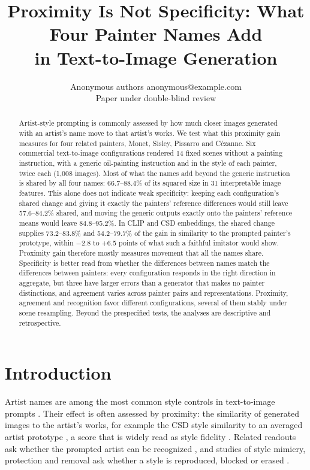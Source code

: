 \documentclass[10pt]{article}
\title{Proximity Is Not Specificity: What Four Painter Names Add\\in Text-to-Image Generation}
\author{\name Anonymous authors \email anonymous@example.com \\
      \addr Paper under double-blind review}
\begin{document}
\maketitle

\begin{abstract}
Artist-style prompting is commonly assessed by how much closer images generated with an
artist's name move to that artist's works. We test what this proximity gain measures for four
related painters, Monet, Sisley, Pissarro and C\'ezanne. Six commercial text-to-image
configurations rendered 14 fixed scenes without a painting instruction, with a generic
oil-painting instruction and in the style of each painter, twice each (1,008 images). Most of
what the names add beyond the generic instruction is shared by all four names: 66.7--88.4\% of
its squared size in 31 interpretable image features. This alone does not indicate weak
specificity: keeping each configuration's shared change and giving it exactly the painters'
reference differences would still leave 57.6--84.2\% shared, and moving the generic outputs
exactly onto the painters' reference means would leave 84.8--95.2\%. In CLIP and CSD
embeddings, the shared change supplies 73.2--83.8\% and 54.2--79.7\% of the gain in similarity
to the prompted painter's prototype, within $-$2.8 to +6.5 points of what such a faithful
imitator would show. Proximity gain therefore mostly measures movement that all the names
share. Specificity is better read from whether the differences between names match the
differences between painters: every configuration responds in the right direction in
aggregate, but three have larger errors than a generator that makes no painter distinctions,
and agreement varies across painter pairs and representations. Proximity, agreement and
recognition favor different configurations, several of them stably under scene resampling.
Beyond the prespecified tests, the analyses are descriptive and retrospective.
\end{abstract}

\section{Introduction}\label{sec:intro}

Artist names are among the most common style controls in text-to-image prompts
\citep{wang2023diffusiondb}. Their effect is often assessed by proximity: the similarity of
generated images to the artist's works, for example the CSD style similarity to an averaged
artist prototype \citep{somepalli2024style}, a score that is widely read as style fidelity
\citep{frochte2026csd}. Related readouts ask whether the prompted artist can be recognized
\citep{casper2023measuring,su2025prompted,moayeri2025rethinking}, and studies of style mimicry,
protection and removal ask whether a style is reproduced, blocked or erased
\citep{shan2023glaze,honig2025adversarial,gandikota2023erasing,kumari2023ablating,zhang2024unlearncanvas}.
\end{document}
